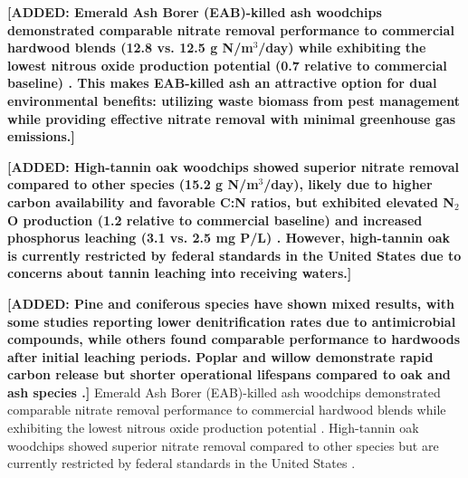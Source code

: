 \documentclass[12pt,a4paper]{article}
\newcommand{\added}[1]{\textcolor{addedtext}{\textbf{[ADDED: #1]}}}
\begin{document}
\added{Emerald Ash Borer (EAB)-killed ash woodchips demonstrated comparable nitrate removal performance to commercial hardwood blends (12.8 vs. 12.5 g N/m$^3$/day) while exhibiting the lowest nitrous oxide production potential (0.7 relative to commercial baseline) \citep{RN611}. This makes EAB-killed ash an attractive option for dual environmental benefits: utilizing waste biomass from pest management while providing effective nitrate removal with minimal greenhouse gas emissions.}

\added{High-tannin oak woodchips showed superior nitrate removal compared to other species (15.2 g N/m$^3$/day), likely due to higher carbon availability and favorable C:N ratios, but exhibited elevated N$_2$O production (1.2 relative to commercial baseline) and increased phosphorus leaching (3.1 vs. 2.5 mg P/L) \citep{RN611}. However, high-tannin oak is currently restricted by federal standards in the United States due to concerns about tannin leaching into receiving waters.}

\added{Pine and coniferous species have shown mixed results, with some studies reporting lower denitrification rates due to antimicrobial compounds, while others found comparable performance to hardwoods after initial leaching periods. Poplar and willow demonstrate rapid carbon release but shorter operational lifespans compared to oak and ash species \citep{RN611}.} Emerald Ash Borer (EAB)-killed ash woodchips demonstrated comparable nitrate removal performance to commercial hardwood blends while exhibiting the lowest nitrous oxide production potential \citep{RN611}. High-tannin oak woodchips showed superior nitrate removal compared to other species but are currently restricted by federal standards in the United States \citep{RN611}.
\end{document}
